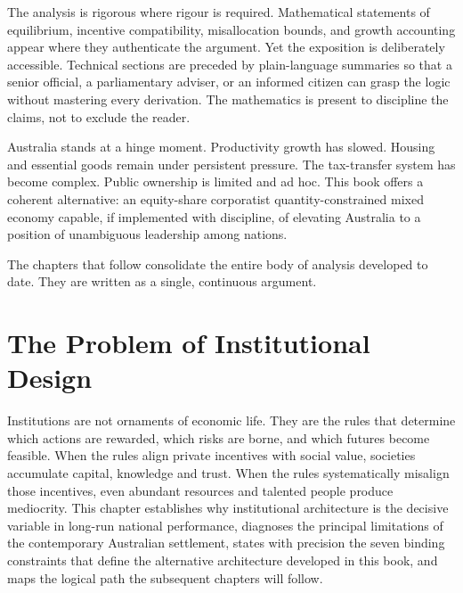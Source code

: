 \documentclass[12pt,anyside]{book}
\theoremstyle{definition}
\theoremstyle{plain}
\theoremstyle{remark}
\begin{document}
The analysis is rigorous where rigour is required. Mathematical statements of equilibrium, incentive compatibility, misallocation bounds, and growth accounting appear where they authenticate the argument. Yet the exposition is deliberately accessible. Technical sections are preceded by plain-language summaries so that a senior official, a parliamentary adviser, or an informed citizen can grasp the logic without mastering every derivation. The mathematics is present to discipline the claims, not to exclude the reader.

Australia stands at a hinge moment. Productivity growth has slowed. Housing and essential goods remain under persistent pressure. The tax-transfer system has become complex. Public ownership is limited and ad hoc. This book offers a coherent alternative: an equity-share corporatist quantity-constrained mixed economy capable, if implemented with discipline, of elevating Australia to a position of unambiguous leadership among nations.

The chapters that follow consolidate the entire body of analysis developed to date. They are written as a single, continuous argument.

\newpage

\tableofcontents
\listoffigures
\listoftables

\mainmatter

\chapter{The Problem of Institutional Design}
\label{ch:problem}

Institutions are not ornaments of economic life. They are the rules that determine which actions are rewarded, which risks are borne, and which futures become feasible. When the rules align private incentives with social value, societies accumulate capital, knowledge and trust. When the rules systematically misalign those incentives, even abundant resources and talented people produce mediocrity. This chapter establishes why institutional architecture is the decisive variable in long-run national performance, diagnoses the principal limitations of the contemporary Australian settlement, states with precision the seven binding constraints that define the alternative architecture developed in this book, and maps the logical path the subsequent chapters will follow.
\end{document}
